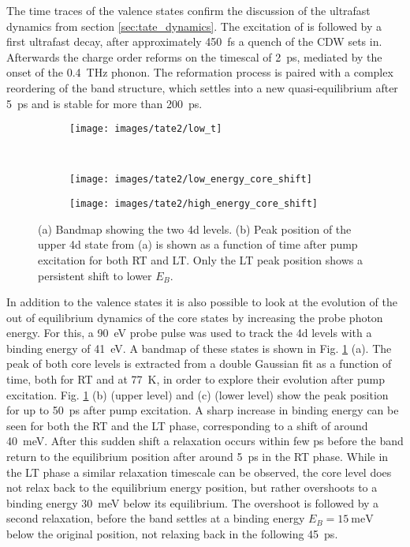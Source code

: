 The time traces of the valence states confirm the discussion of the ultrafast dynamics from section \ref{sec:tate_dynamics}.
The excitation of  is followed by a first ultrafast decay, after approximately \qty{450}{\femto\second} a quench of the CDW sets in.
Afterwards the charge order reforms on the timescal of \qty{2}{\pico\second}, mediated by the onset of the \qty{0.4}{\tera\hertz} phonon.
The reformation process is paired with a complex reordering of the band structure, which settles into a new quasi-equilibrium after \qty{5}{\pico\second} and is stable for more than \qty{200}{\pico\second}.

\begin{figure}[t!]
	\centering
	\begin{subfigure}[b]{0.33\textwidth}
		\texttt{[image: images/tate2/low\_t]}
		\caption{}
	\end{subfigure}
	\\
	\begin{subfigure}[b]{0.49\textwidth}
		\texttt{[image: images/tate2/low\_energy\_core\_shift]}
		\caption{}
	\end{subfigure}
	\hfill
	\begin{subfigure}[b]{0.49\textwidth}
		\texttt{[image: images/tate2/high\_energy\_core\_shift]}
		\caption{}
	\end{subfigure}
	\caption{(a) Bandmap showing the two  4d levels. (b) Peak position of the upper 4d state from (a) is shown as a function of time after pump excitation for both RT and LT. Only the LT peak position shows a persistent shift to lower $E_B$.}
	\label{fig:tate_core}
\end{figure}

In addition to the valence states it is also possible to look at the evolution of the out of equilibrium dynamics of the core states by increasing the probe photon energy.
For this, a \qty{90}{\electronvolt} probe pulse was used to track the  4d levels with a binding energy of \qty{41}{\electronvolt}.
A bandmap of these states is shown in Fig. \ref{fig:tate_core} (a).
The peak of both core levels is extracted from a double Gaussian fit as a function of time, both for RT and at \qty{77}{\kelvin}, in order to explore their evolution after pump excitation.
Fig. \ref{fig:tate_core} (b) (upper level) and (c) (lower level) show the peak position for up to \qty{50}{\pico\second} after pump excitation.
A sharp increase in binding energy can be seen for both the RT and the LT phase, corresponding to a shift of around \qty{40}{\milli\electronvolt}.
After this sudden shift a relaxation occurs within few \unit{\pico\second} before the band return to the equilibrium position after around \qty{5}{\pico\second} in the RT phase.
While in the LT phase a similar relaxation timescale can be observed, the core level does not relax back to the equilibrium energy position, but rather overshoots to a binding energy \qty{30}{\milli\electronvolt} below its equilibrium.
The overshoot is followed by a second relaxation, before the band settles at a binding energy $E_B=\qty{15}{\milli\electronvolt}$ below the original position, not relaxing back in the following \qty{45}{\pico\second}.

